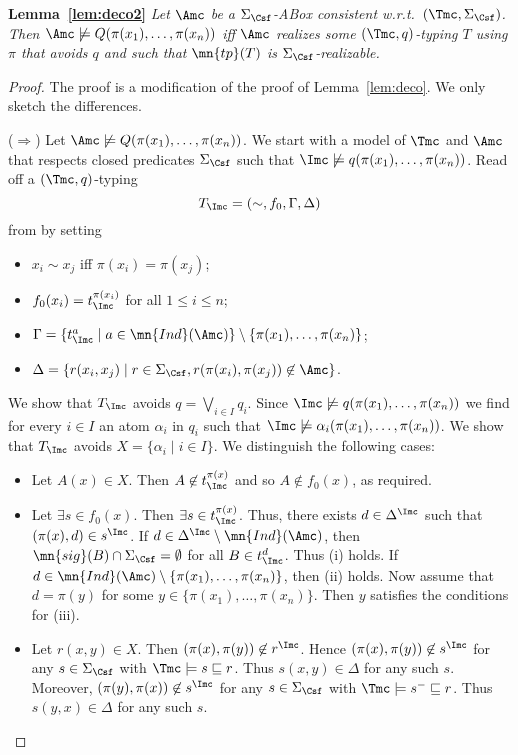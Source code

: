 \documentclass{lmcs}
\theoremstyle{definition}
\begin{document}
\medskip
\noindent
{\bf Lemma~\ref{lem:deco2}}
{\em
	Let $\Amc$ be a $\Sigma_{\Csf}$-ABox consistent 
	w.r.t.~$(\Tmc,\Sigma_{\Csf})$. Then $\Amc \not\models 
	Q(\pi(x_{1}),\ldots,\pi(x_{n}))$ iff $\Amc$ realizes some 
	$(\Tmc,q)$-typing $T$ using $\pi$ that avoids $q$ and such that 
	$\mn{tp}(T)$ is $\Sigma_{\Csf}$-realizable.
}
\begin{proof} The proof is a modification of the proof of
    Lemma~\ref{lem:deco}. We only sketch the differences.

    \smallskip

	($\Rightarrow$) Let $\Amc \not\models 
	Q(\pi(x_{1}),\ldots,\pi(x_{n}))$.  We start with a model \Imc of 
	$\Tmc$ and $\Amc$ that respects closed predicates $\Sigma_{\Csf}$ such 
	that $\Imc \not\models q(\pi(x_{1}),\ldots,\pi(x_{n}))$. Read off a 
	$(\Tmc,q)$-typing
$$
T_\Imc=(\sim,f_0,\Gamma,\Delta)
$$
from \Imc by setting
\begin{itemize}
\item $x_{i}\sim x_{j}$ iff $\pi(x_{i})=\pi(x_{j})$;
\item $f_0(x_{i})=t^{\pi(x_{i})}_\Imc$ for all $1\leq i \leq n$;
\item $\Gamma = \{ t^a_\Imc \mid a\in
  \mn{Ind}(\Amc)\}\setminus\{\pi(x_{1}),\ldots,\pi(x_{n})\}$;
\item $\Delta = \{ r(x_{i},x_{j})\mid r\in \Sigma_{\Csf},
  r(\pi(x_{i}),\pi(x_{j}))\not\in \Amc\}$.
\end{itemize}
We show that $T_{\Imc}$ avoids $q=\bigvee_{i\in I}q_{i}$. Since $\Imc
\not\models q(\pi(x_{1}),\ldots,\pi(x_{n}))$ we find for every $i\in
I$ an atom $\alpha_{i}$ in $q_{i}$ such that $\Imc\not\models
\alpha_{i}(\pi(x_{1}),\ldots,\pi(x_{n}))$.  We show that $T_{\Imc}$
avoids $X=\{ \alpha_{i}\mid i\in I\}$. We distinguish the following
cases:
\begin{itemize}
\item Let $A(x)\in X$. Then $A\not\in t^{\pi(x)}_\Imc$ and so
  $A\not\in f_{0}(x)$, as required.
\item Let $\exists s\in f_{0}(x)$. Then $\exists s \in
  t^{\pi(x)}_\Imc$. Thus, there exists $d\in \Delta^{\Imc}$ such that
  $(\pi(x),d)\in s^{\Imc}$.  If $d\in \Delta^{\Imc}\setminus
  \mn{Ind}(\Amc)$, then $\mn{sig}(B) \cap \Sigma_{\Csf}=\emptyset$ for all
  $B\in t^{d}_{\Imc}$. Thus (i) holds.  If $d\in
  \mn{Ind}(\Amc)\setminus \{\pi(x_{1}),\ldots,\pi(x_{n})\}$, then (ii)
  holds.  Now assume that $d = \pi(y)$ for some $y\in
  \{\pi(x_{1}),\ldots,\pi(x_{n})\}$.  Then $y$ satisfies the
  conditions for (iii).
\item Let $r(x,y)\in X$. Then $(\pi(x),\pi(y))\not\in r^{\Imc}$. Hence
  $(\pi(x),\pi(y))\not\in s^{\Imc}$ for any $s\in \Sigma_{\Csf}$ with
  $\Tmc\models s \sqsubseteq r$. Thus $s(x,y)\in \Delta$ for any such
  $s$. Moreover, $(\pi(y),\pi(x))\not\in s^{\Imc}$ for any $s\in
  \Sigma_{\Csf}$ with $\Tmc\models s^{-} \sqsubseteq r$. Thus $s(y,x)\in
  \Delta$ for any such $s$.
\end{itemize}


\end{proof}
\end{document}
